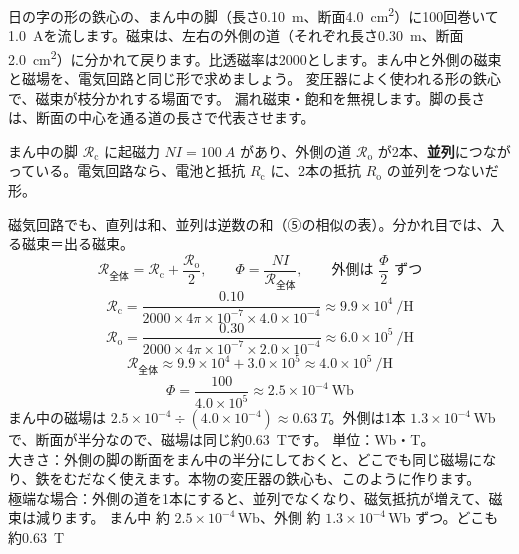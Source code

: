 \label{ph:電-7:ex12}
\begin{phreidai}
日の字の形の鉄心の、まん中の脚（長さ\qty{0.10}{m}、断面\qty{4.0}{cm^2}）に100回巻いて\qty{1.0}{A}を流します。磁束は、左右の外側の道（それぞれ長さ\qty{0.30}{m}、断面\qty{2.0}{cm^2}）に分かれて戻ります。比透磁率は2000とします。まん中と外側の磁束と磁場を、電気回路と同じ形で求めましょう。
\phbamen
変圧器によく使われる形の鉄心で、磁束が枝分かれする場面です。
\phmushi
漏れ磁束・飽和を無視します。脚の長さは、断面の中心を通る道の長さで代表させます。
\phzu
\begin{minipage}[t]{0.5\linewidth}
まん中の脚 $\mathcal R_{\mathrm c}$ に起磁力 $NI=\qty{100}{A}$ があり、外側の道 $\mathcal R_{\mathrm o}$ が2本、\textbf{並列}につながっている。電気回路なら、電池と抵抗 $R_{\mathrm c}$ に、2本の抵抗 $R_{\mathrm o}$ の並列をつないだ形。
\end{minipage}\hfill
\begin{minipage}[t]{0.46\linewidth}\centering
{}
\end{minipage}
\phriyu
磁気回路でも、直列は和、並列は逆数の和（⑤の相似の表）。分かれ目では、入る磁束＝出る磁束。
\phtateru
\[\mathcal R_{\text{全体}}=\mathcal R_{\mathrm c}+\frac{\mathcal R_{\mathrm o}}{2},\qquad\Phi=\frac{NI}{\mathcal R_{\text{全体}}},\qquad\text{外側は }\frac{\Phi}{2}\text{ ずつ}\]
\phtoku
\[\mathcal R_{\mathrm c}=\frac{0.10}{2000\times4\pi\times10^{-7}\times4.0\times10^{-4}}\approx9.9\times10^4\ \text{/H}\]
\[\mathcal R_{\mathrm o}=\frac{0.30}{2000\times4\pi\times10^{-7}\times2.0\times10^{-4}}\approx6.0\times10^5\ \text{/H}\]
\[\mathcal R_{\text{全体}}\approx9.9\times10^4+3.0\times10^5\approx4.0\times10^5\ \text{/H}\]
\[\Phi=\frac{100}{4.0\times10^5}\approx2.5\times10^{-4}\ \text{Wb}\]
まん中の磁場は $2.5\times10^{-4}\div(4.0\times10^{-4})\approx\qty{0.63}{T}$。外側は1本 $1.3\times10^{-4}$\,Wb で、断面が半分なので、磁場は同じ約\qty{0.63}{T}です。
\phtashikame
単位：Wb・T。\\
大きさ：外側の脚の断面をまん中の半分にしておくと、どこでも同じ磁場になり、鉄をむだなく使えます。本物の変圧器の鉄心も、このように作ります。\\
極端な場合：外側の道を1本にすると、並列でなくなり、磁気抵抗が増えて、磁束は減ります。
\kotae まん中 約 $2.5\times10^{-4}$\,Wb、外側 約 $1.3\times10^{-4}$\,Wb ずつ。どこも約\qty{0.63}{T}
\end{phreidai}
